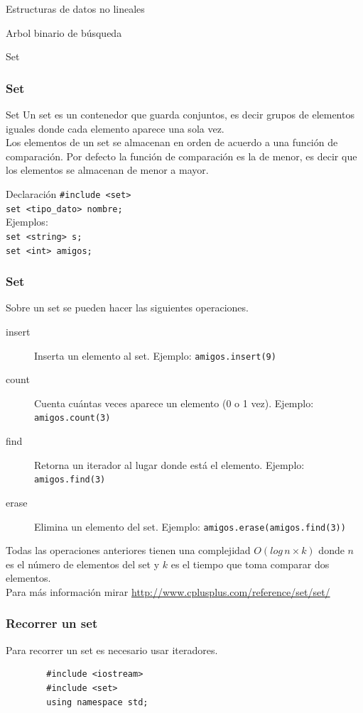 \documentclass{beamer}
\begin{document}
\begin{section}{Estructuras de datos no lineales}
\begin{subsection}{Arbol binario de búsqueda}
\begin{subsubsection}{Set}
	\begin{frame}[fragile]
		\frametitle{Set}
		\begin{block}{Set}
			Un set es un contenedor que guarda conjuntos, es decir grupos de elementos iguales donde cada elemento aparece una sola vez.\\
			Los elementos de un set se almacenan en orden de acuerdo a una función de comparación. Por defecto la función de comparación es la de menor, es decir que los elementos se almacenan de menor a mayor.\\
		\end{block}
		\begin{block}{Declaración}
			\verb|#include <set>|\\
			\verb|set <tipo_dato> nombre;|\\
			Ejemplos:\\
			\verb|set <string> s;|\\
			\verb|set <int> amigos;|
		\end{block}
	\end{frame}

	\begin{frame}[fragile]
		\frametitle{Set}
		Sobre un set se pueden hacer las siguientes operaciones.
		\begin{description}
			\item[insert] Inserta un elemento al set. Ejemplo: \verb|amigos.insert(9)|
			\item[count] Cuenta cuántas veces aparece un elemento (0 o 1 vez). Ejemplo: \verb|amigos.count(3)|
			\item[find] Retorna un iterador al lugar donde está el elemento. Ejemplo: \verb|amigos.find(3)|
			\item[erase] Elimina un elemento del set. Ejemplo: \verb|amigos.erase(amigos.find(3))|
		\end{description}
		Todas las operaciones anteriores tienen una complejidad $O(log\,n \times k)$ donde $n$ es el número de elementos del set y $k$ es el tiempo que toma comparar dos elementos.\\
		Para más información mirar \url{http://www.cplusplus.com/reference/set/set/}
	\end{frame}

	\begin{frame}[fragile]
		\frametitle{Recorrer un set}
		Para recorrer un set es necesario usar iteradores.\\
		\begin{lstlisting}
		#include <iostream>
		#include <set>
		using namespace std;


\end{lstlisting}
\end{frame}
\end{subsubsection}
\end{subsection}
\end{section}
\end{document}
